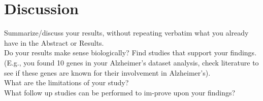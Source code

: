 
\section{Discussion}

Summarize/discuss your results, without repeating verbatim what you already have in the
Abstract or Results.\\
Do your results make sense biologically? Find studies that support your findings. (E.g.,
you found 10 genes in your Alzheimer's dataset analysis, check literature to see if
these genes are known for their involvement in Alzheimer's).\\
What are the limitations of your study?\\
What follow up studies can be performed to im-prove upon your findings?
